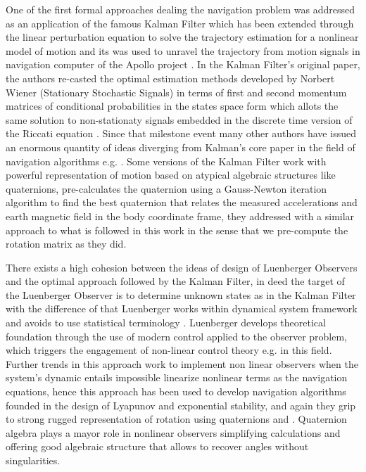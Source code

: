 \documentclass[10pt,conference]{IEEEtran}
\begin{document}
One of the first formal approaches dealing the navigation problem was addressed as an application of the famous Kalman Filter which has been extended through the linear perturbation equation to solve the trajectory estimation for a nonlinear model of motion and its was used to unravel the trajectory from motion signals in navigation computer of the Apollo project \cite{Schmidt1962}.  In the Kalman Filter's original paper, the authors re-casted the optimal estimation methods developed by Norbert Wiener (Stationary Stochastic Signals) in terms of first and second momentum matrices of conditional probabilities in the states space form which allots the same solution to non-stationaty signals embedded in the discrete time version of the Riccati equation \cite{Grewal2010}. Since that milestone event many other authors have issued an enormous quantity of ideas diverging from Kalman's core paper in the field of navigation algorithms e.g. \cite{Bistrovs2012, Gandhi2007}. Some versions of the Kalman Filter work with powerful representation of motion based on atypical algebraic structures like quaternions, \cite{Marins2001} pre-calculates the quaternion using a Gauss-Newton iteration algorithm to find the best quaternion that relates the measured accelerations and earth magnetic field in the body coordinate frame, they addressed with a similar approach to what is followed in this work in the sense that we pre-compute the rotation matrix as they did.\par 
%
There exists a high cohesion between the ideas of design of Luenberger Observers and the optimal approach followed by the Kalman Filter, in deed the target of the Luenberger Observer is to determine unknown states as in the Kalman Filter with the difference of that Luenberger works within dynamical system framework  and avoids to use statistical terminology \cite{Luenberger1966}. Luenberger develops theoretical foundation through the use of modern control applied to the observer problem, which triggers the engagement of non-linear control theory e.g. \cite{Kou1975}\cite{Thau1973} in this field. Further trends in this approach work to implement non linear observers when the system's dynamic entails impossible linearize nonlinear terms as the navigation equations, hence this approach has been used to develop navigation algorithms founded in  the design of Lyapunov and exponential stability, and again they grip to strong rugged representation of rotation using quaternions \cite{Vik2001} \cite{Thienel2003} and \cite{Hua2009}. Quaternion algebra plays a mayor role in nonlinear observers simplifying calculations and offering good algebraic structure that allows to recover angles without singularities.\par
\end{document}
